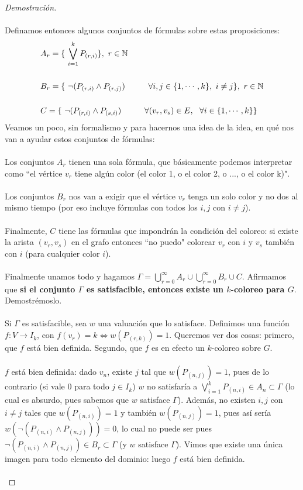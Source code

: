 \documentclass[12pt]{article}
\newcommand{\N}{\mathbb{N}}
\newcommand\tab[1][1cm]{\hspace*{#1}}
\newenvironment{dem}{\begin{proof}[Demostración]}{\end{proof}}
\begin{document}
\begin{dem}
\\ \\ Definamos entonces algunos conjuntos de fórmulas sobre estas proposiciones:
\begin{align*}
&A_r = \{\ \bigvee_{i=1}^{k}P_{(r,i)} \},\ r \in \N\\ \\
&B_r = \{\ \neg(P_{(r,i)}\land P_{(r,j)}) \tab \forall i,j \in \{1, \cdots, k\},\  i \neq j \} ,\ r \in \N\\ \\
&C = \{\ \neg(P_{(r,i)} \land P_{(s,i)}) \tab \forall (v_r,v_s) \in E,\ \ \forall i \in \{1, \cdots, k\} \} \end{align*}
Veamos un poco, sin formalismo y para hacernos una idea de la idea, en qué nos van a ayudar estos conjuntos de fórmulas: \\ \\ Los conjuntos $A_r$ tienen una sola fórmula, que básicamente podemos interpretar como ``el vértice $v_r$ tiene algún color (el color 1, o el color 2, o ..., o el color k)". \\ \\ Los conjuntos $B_r$ nos van a exigir que el vértice $v_r$ tenga un solo color y no dos al mismo tiempo (por eso incluye fórmulas con todos los $i,j$ con $i \neq j$). \\ \\ Finalmente, $C$ tiene las fórmulas que impondrán la condición del coloreo: si existe la arista $(v_r, v_s)$ en el grafo entonces ``no puedo" colorear $v_r$ con $i$ y $v_s$ también con $i$ (para cualquier color $i$).
\\ \\
Finalmente unamos todo y hagamos $\Gamma = \bigcup^\infty_{r=0}A_r \cup \bigcup^\infty_{r=0}B_r \cup C$. Afirmamos que \textbf{si el conjunto $\Gamma$ es satisfacible, entonces existe un $k$-coloreo para $G$}. Demostrémoslo. \\ \\ Si $\Gamma$ es satisfacible, sea $w$ una valuación que lo satisface. Definimos una función $f:V\rightarrow I_k$, con $f(v_r) = k \Leftrightarrow w(P_{(r,k)}) = 1$. Queremos ver dos cosas: primero, que $f$ está bien definida. Segundo, que $f$ es en efecto un $k$-coloreo sobre $G$. \\ \\$f$ está bien definida: dado $v_n$, existe $j$ tal que $w(P_{(n,j)}) = 1$, pues de lo contrario (si vale 0 para todo $j \in I_k$) $w$ no satisfaría a $\bigvee_{i=1}^{k}P_{(n,i)} \in A_n \subset \Gamma$ (lo cual es absurdo, pues sabemos que $w$ satisface $\Gamma$). Además, no existen $i, j$ con $i \neq j$ tales que $w(P_{(n,i)}) = 1$ y también $w(P_{(n,j)}) = 1$, pues así sería $w(\neg(P_{(n,i)} \land P_{(n,j)})) = 0$, lo cual no puede ser pues $\neg(P_{(n,i)} \land P_{(n,j)}) \in B_r \subset \Gamma$ (y $w$ satisface $\Gamma$). Vimos que existe una única imagen para todo elemento del dominio: luego $f$ está bien definida. \\ \\

\end{dem}
\end{document}
